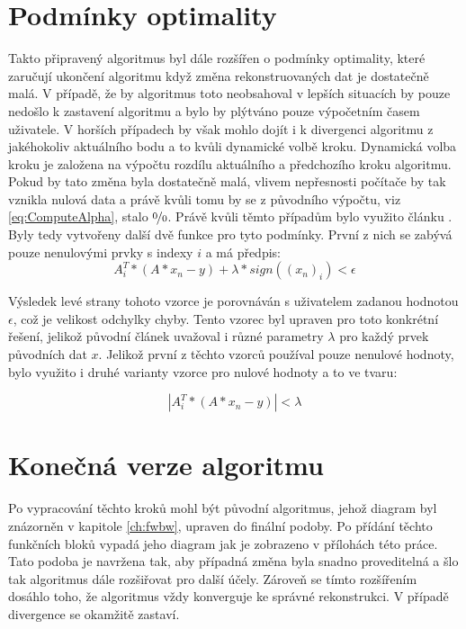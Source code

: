 \documentclass[FM,BP]{tulthesis}
\newcounter{Vzorce}
\begin{document}
\section{Podmínky optimality}
Takto připravený algoritmus byl dále rozšířen o podmínky optimality, které zaručují ukončení algoritmu když změna rekonstruovaných dat je dostatečně malá. V případě, že by algoritmus toto neobsahoval v lepších situacích by pouze nedošlo k zastavení algoritmu a bylo by plýtváno pouze výpočetním časem uživatele. V horších případech by však mohlo dojít i k divergenci algoritmu z jakéhokoliv aktuálního bodu a to kvůli dynamické volbě kroku. Dynamická volba kroku je založena na výpočtu rozdílu aktuálního a předchozího kroku algoritmu. Pokud by tato změna byla dostatečně malá, vlivem nepřesnosti počítače by tak vznikla nulová data a právě kvůli tomu by se z původního výpočtu, viz \ref{eq:ComputeAlpha}, stalo $\nicefrac{0}{0}$. Právě kvůli těmto případům bylo využito článku \cite{homotopy}. Byly tedy vytvořeny další dvě funkce pro tyto podmínky. První z nich se zabývá pouze nenulovými prvky s indexy $i$ a má předpis:
\begin{equation} \label{eq:homotopy1}  \tag{Vzorec \theVzorce}
A_{i}^{T}*(A*x_{n} - y) + \lambda * sign((x_{n})_{i}) < \epsilon
\end{equation}

Výsledek levé strany tohoto vzorce je porovnáván s uživatelem zadanou hodnotou $\epsilon$, což je velikost odchylky chyby. Tento vzorec byl upraven pro toto konkrétní řešení, jelikož původní článek uvažoval i různé parametry $\lambda$ pro každý prvek původních dat $x$. Jelikož první z těchto vzorců používal pouze nenulové hodnoty, bylo využito i druhé varianty vzorce pro nulové hodnoty a to ve tvaru:

\begin{equation} \label{eq:homotopy2}  \tag{Vzorec \theVzorce}
\left|A_{i}^{T}*(A*x_{n} - y)\right| < \lambda
\end{equation}

\section{Konečná verze algoritmu}
Po vypracování těchto kroků mohl být původní algoritmus, jehož diagram byl znázorněn v kapitole \ref{ch:fwbw}, upraven do finální podoby. Po přídání těchto funkčních bloků vypadá jeho diagram jak je zobrazeno v přílohách této práce. Tato podoba je navržena tak, aby případná změna byla snadno proveditelná a šlo tak algoritmus dále rozšiřovat pro další účely. Zároveň se tímto rozšířením dosáhlo toho, že algoritmus vždy konverguje ke správné rekonstrukci. V případě divergence se okamžitě zastaví.
\end{document}
